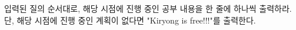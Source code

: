 입력된 질의 순서대로, 해당 시점에 진행 중인 공부 내용을 한 줄에 하나씩 출력하라. 
단, 해당 시점에 진행 중인 계획이 없다면 "Kiryong is free!!!"를 출력한다.